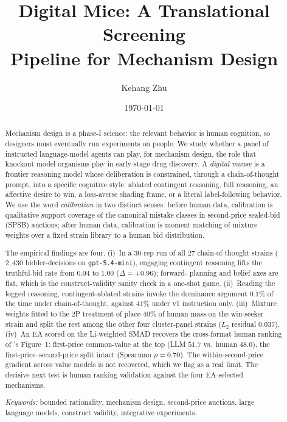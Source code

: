 \documentclass[12pt]{article}
\title{\textbf{Digital Mice: A Translational Screening\\
Pipeline for Mechanism Design}}
\author{Kehang Zhu}
\date{\today}
\newcommand{\SPSB}{SPSB}
\begin{document}
\maketitle

\begin{abstract}
\noindent
Mechanism design is a phase-I science: the relevant behavior is human
cognition, so designers must eventually run experiments on people. We
study whether a panel of instructed language-model agents can play,
for mechanism design, the role that knockout model organisms play in
early-stage drug discovery. A \emph{digital mouse} is a frontier
reasoning model whose deliberation is constrained, through a
chain-of-thought prompt, into a specific cognitive style: ablated
contingent reasoning, full reasoning, an affective desire to win, a
loss-averse shading frame, or a literal label-following behavior. We
use the word \emph{calibration} in two distinct senses: before human
data, calibration is qualitative support coverage of the canonical
mistake classes in second-price sealed-bid (\SPSB{}) auctions; after
human data, calibration is moment matching of mixture weights over a
fixed strain library to a human bid distribution.

The empirical findings are four. (i)~In a $30$-rep run of all $27$
chain-of-thought strains ($2{,}430$ bidder-decisions on
\texttt{gpt-5.4-mini}), engaging contingent reasoning lifts the
truthful-bid rate from $0.04$ to $1.00$ ($\Delta=+0.96$); forward-
planning and belief axes are flat, which is the construct-validity
sanity check in a one-shot game. (ii)~Reading the logged reasoning,
contingent-ablated strains invoke the dominance argument $0.1\%$ of
the time under chain-of-thought, against $41\%$ under v1 instruction
only. (iii)~Mixture weights fitted to the 2P treatment of
\citet{li2017} place $40\%$ of human mass on the win-seeker strain
and split the rest among the other four cluster-panel strains
($L_2$ residual $0.037$). (iv)~An EA scored on the Li-weighted SMAD
recovers the cross-format human ranking of
\citet{zhuLLMAuction2024}'s Figure~1: first-price common-value at
the top (LLM $51.7$ vs.\ human $48.0$), the first-price--second-price
split intact (Spearman $\rho = 0.70$). The within-second-price
gradient across value models is not recovered, which we flag as a
real limit. The decisive next test is human ranking validation
against the four EA-selected mechanisms.

\vspace{0.5em}
\noindent\textit{Keywords:} bounded rationality, mechanism design,
second-price auctions, large language models, construct validity,
integrative experiments.
\end{abstract}
\end{document}
